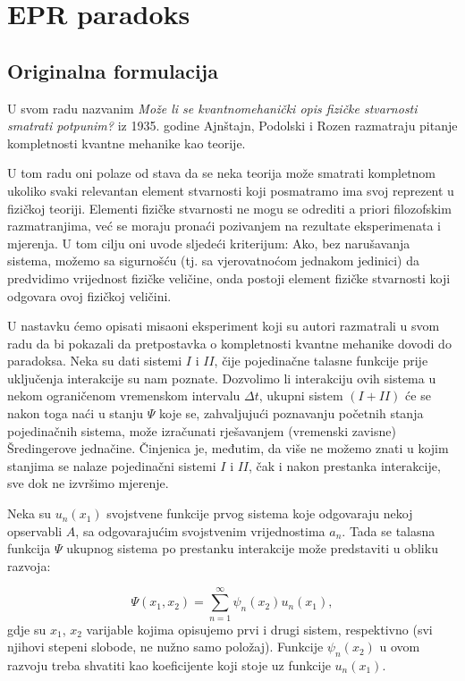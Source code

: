 \chapter{EPR paradoks}
\section{Originalna formulacija}
U svom radu nazvanim {\it{Može li se kvantnomehanički opis fizičke stvarnosti smatrati potpunim?}} iz 1935. godine Ajnštajn, Podolski i Rozen razmatraju pitanje kompletnosti kvantne mehanike kao teorije.

U tom radu oni polaze od stava da se neka teorija može smatrati kompletnom ukoliko  svaki relevantan element stvarnosti koji posmatramo ima svoj reprezent u fizičkoj teoriji.
Elementi fizičke stvarnosti ne mogu se odrediti a priori filozofskim razmatranjima, već se moraju pronaći pozivanjem na rezultate eksperimenata i mjerenja. U tom cilju oni uvode sljedeći kriterijum: Ako, bez narušavanja sistema, možemo sa sigurnošću (tj. sa vjerovatnoćom jednakom jedinici) da predvidimo vrijednost fizičke veličine, onda postoji element fizičke stvarnosti koji odgovara ovoj fizičkoj veličini.


U nastavku ćemo opisati misaoni eksperiment koji su autori razmatrali u svom radu da bi pokazali da pretpostavka o kompletnosti kvantne mehanike dovodi do paradoksa.
Neka su dati sistemi $I$ i $II$, čije pojedinačne talasne funkcije prije uklju\v cenja interakcije su nam poznate. Dozvolimo li interakciju ovih sistema u nekom ograničenom vremenskom intervalu $\Delta t$,
ukupni sistem $(I + II)$ će se nakon toga naći u stanju $\Psi$ koje se, zahvaljujući poznavanju početnih stanja pojedinačnih sistema,
može izračunati rješavanjem (vremenski zavisne) Šredingerove jednačine.
Činjenica je, međutim, da više ne možemo znati u kojim stanjima se nalaze pojedinačni sistemi $I$ i $II$, čak i nakon prestanka interakcije, sve dok ne izvršimo mjerenje.

Neka su $u_n(x_1)$ svojstvene funkcije prvog sistema koje odgovaraju nekoj opservabli $A$, sa odgovarajućim svojstvenim vrijednostima $a_n$.
Tada se talasna funkcija $\Psi$ ukupnog sistema po prestanku interakcije može predstaviti u obliku razvoja:

\begin{equation}
    \Psi(x_1, x_2) = \sum_{n=1}^{\infty} \psi_n(x_2)u_n(x_1), \label{eq:talasna_funkcija_ukupnog_sistema_nakon_interakcije}
\end{equation}
gdje su $x_1$, $x_2$ varijable kojima opisujemo prvi i drugi sistem, respektivno (svi njihovi stepeni slobode, ne nužno samo položaj).
Funkcije $\psi_n(x_2)$ u ovom razvoju treba shvatiti kao koeficijente koji stoje uz funkcije $u_n(x_1)$.

